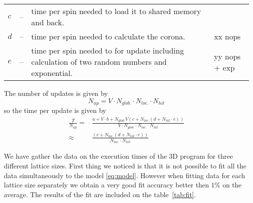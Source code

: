 \documentclass[a4paper]{llncs}
\begin{document}
\begin{table}
\begin{center} \begin{tabular}{lcp{8cm}p{2cm}}
$c$ &--& time per spin needed to load it to shared memory and back.&\\
$d$ &--& time per spin needed to calculate the corona.& xx nops\\
$e$ &--& time per spin needed to for update including calculation of two random numbers and exponential. & yy nops + exp
\end{tabular}
\end{center}
\caption{\label{tab:pars-int}}
\end{table}

The number of updates is given by
\begin{equation}
N_{up}=V\cdot N_{glob.}\cdot N_{loc.}\cdot N_{hit}
\end{equation}
so the time per update is given by
\begin{equation}\begin{split}
\frac{T}{N_{up}}=&\frac{a+ V \cdot b + N_{glob.} V \left(c + N_{loc.}\left(d + N_{hit}\cdot e\right)\right)}{V\cdot N_{glob.}\cdot N_{loc.}\cdot N_{hit}}\\
\approx&
\frac{ \left(c + N_{loc.}\left(d + N_{hit}\cdot e\right)\right)}{N_{loc.}\cdot N_{hit}}
\end{split}
\end{equation}

We have gather the data on the execution times of the 3D program for
three different lattice sizes. First thing we noticed is that it is
not possible to fit all the data simultaneously to the model
\eqref{eq:model}. However when fitting data for each lattice size
separately we obtain a very good fit accuracy better then $1\%$ on the
average. The results of the fit are included on the table~\ref{tab:fit}.
\end{document}
